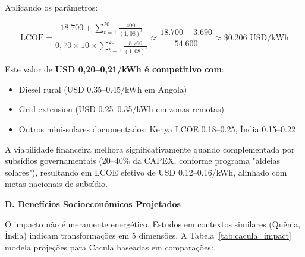 \documentclass[12pt, a4paper]{article}
\begin{document}
Aplicando os parâmetros:

\[
\text{LCOE} = \frac{18.700 + \sum_{t=1}^{20} \frac{400}{(1,08)^t}}{0,70 \times 10 \times \sum_{t=1}^{20} \frac{8.760}{(1,08)^t}}  
\approx \frac{18.700 + 3.690}{54.600} \approx \$0.206\text{ USD/kWh}
\]

Este valor de \textbf{USD 0,20--0,21/kWh é competitivo com}:
\begin{itemize}
\item Diesel rural (USD 0.35--0.45/kWh em Angola)
\item Grid extension (USD 0.25--0.35/kWh em zonas remotas)
\item Outros mini-solares documentados: Kenya LCOE 0.18–0.25, Índia 0.15–0.22
\end{itemize}

A viabilidade financeira melhora significativamente quando complementada por subsídios governamentais (20--40\% da CAPEX, conforme programa "aldeias solares"), resultando em LCOE efetivo de USD 0.12--0.16/kWh, alinhado com metas nacionais de subsídio.

\textbf{D. Benefícios Socioeconómicos Projetados}

O impacto não é meramente energético. Estudos em contextos similares (Quênia, Índia) 
indicam transformações em 5 dimensões. A Tabela~\ref{tab:cacula_impact} modela projeções 
para Cacula baseadas em comparações:
\end{document}
